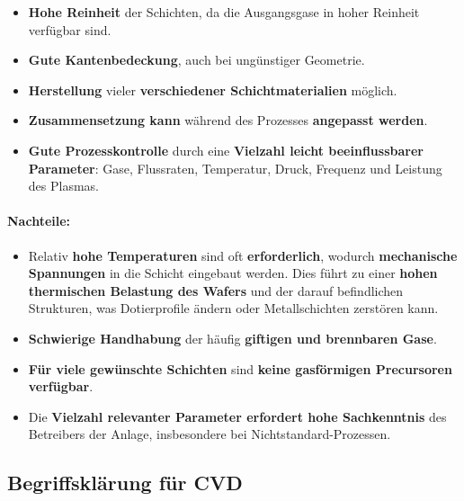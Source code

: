 \documentclass{article} %
\begin{document}
\begin{itemize}
    \item \textbf{Hohe Reinheit} der Schichten, da die Ausgangsgase in hoher Reinheit verfügbar sind.
    \item \textbf{Gute Kantenbedeckung}, auch bei ungünstiger Geometrie.
    \item \textbf{Herstellung} vieler \textbf{verschiedener Schichtmaterialien} möglich.
    \item \textbf{Zusammensetzung kann} während des Prozesses \textbf{angepasst werden}.
    \item \textbf{Gute Prozesskontrolle} durch eine \textbf{Vielzahl leicht beeinflussbarer Parameter}: Gase, Flussraten, Temperatur, Druck, Frequenz und Leistung des Plasmas.
\end{itemize}

\vspace{0.0em}

\paragraph{Nachteile:}

\begin{itemize}
    \item Relativ \textbf{hohe Temperaturen} sind oft \textbf{erforderlich}, wodurch \textbf{mechanische Spannungen} in die Schicht eingebaut werden. Dies führt zu einer \textbf{hohen thermischen Belastung des Wafers} und der darauf befindlichen Strukturen, was Dotierprofile ändern oder Metallschichten zerstören kann.
    \item \textbf{Schwierige Handhabung} der häufig \textbf{giftigen und brennbaren Gase}.
    \item \textbf{Für viele gewünschte Schichten} sind \textbf{keine gasförmigen Precursoren verfügbar}.
    \item Die \textbf{Vielzahl relevanter Parameter erfordert hohe Sachkenntnis} des Betreibers der Anlage, insbesondere bei Nichtstandard-Prozessen.
\end{itemize}




\vspace{1em}

\subsection{Begriffsklärung für CVD} %
\end{document}
